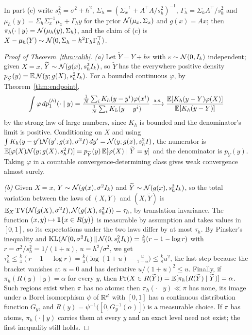 \documentclass{article}
\theoremstyle{plain}
\theoremstyle{remark}
\begin{document}
In part (c) write $s_h^2=\sigma^2+h^2$, $\Sigma_h=(\Sigma_x^{-1}+A^\top A/s_h^2)^{-1}$, $\Gamma_h=\Sigma_hA^\top/s_h^2$ and $\mu_h(y)=\Sigma_h\Sigma_x^{-1}\mu_x+\Gamma_hy$ for the prior $\mathcal{N}(\mu_x,\Sigma_x)$ and $g(x)=Ax$; then $\pi_h(\cdot\mid y)=\mathcal{N}(\mu_h(y),\Sigma_h)$, and the claim of (c) is $X-\mu_h(Y)\sim\mathcal{N}(0,\Sigma_h-h^2\Gamma_h\Gamma_h^\top)$.

\begin{proof}[Proof of Theorem~\ref{thm:calib}]
\emph{(a)} Let $\widetilde Y=Y+h\varepsilon$ with $\varepsilon\sim\mathcal{N}(0,I_k)$ independent;
given $X=x$, $\widetilde Y\sim\mathcal{N}(g(x),s_h^2I_k)$, so $\widetilde Y$ has the everywhere
positive density $p_{\widetilde Y}(y)=\mathbb{E}\,\mathcal{N}(y;g(X),s_h^2I_k)$. For a bounded continuous
$\varphi$, by Theorem~\ref{thm:endpoint},
\begin{equation*}
\int\varphi\,dp_1^{(h)}(\cdot\mid y)
=\frac{\frac1N\sum_iK_h(y-y^i)\varphi(x^i)}{\frac1N\sum_iK_h(y-y^i)}
\xrightarrow{\text{a.s.}}
\frac{\mathbb{E}[K_h(y-Y)\varphi(X)]}{\mathbb{E}[K_h(y-Y)]}
\end{equation*}
by the strong law of large numbers, since $K_h$ is bounded and the denominator's limit is
positive. Conditioning on $X$ and using $\int K_h(y-y')\mathcal{N}(y';g(x),\sigma^2I)\,dy'=
\mathcal{N}(y;g(x),s_h^2I)$, the numerator is $\mathbb{E}[\varphi(X)\mathcal{N}(y;g(X),s_h^2I)]
=p_{\widetilde Y}(y)\,\mathbb{E}[\varphi(X)\mid\widetilde Y=y]$ and the denominator is
$p_{\widetilde Y}(y)$. Taking $\varphi$ in a countable convergence-determining class gives
weak convergence almost surely.

\emph{(b)} Given $X=x$, $Y\sim\mathcal{N}(g(x),\sigma^2I_k)$ and $\widetilde Y\sim\mathcal{N}(g(x),s_h^2I_k)$,
so the total variation between the laws of $(X,Y)$ and $(X,\widetilde Y)$ is
$\mathbb{E}_X\,\mathrm{TV}(\mathcal{N}(g(X),\sigma^2I),\mathcal{N}(g(X),s_h^2I))=\tau_h$, by translation
invariance. The function $(x,y)\mapsto\mathbf{1}\{x\in R(y)\}$ is measurable by assumption and
takes values in $[0,1]$, so its expectations under the two laws differ by at most $\tau_h$. By Pinsker's inequality and
$\mathrm{KL}(\mathcal{N}(0,\sigma^2I_k)\,\|\,\mathcal{N}(0,s_h^2I_k))=\frac k2(r-1-\log r)$ with
$r=\sigma^2/s_h^2=1/(1+u)$, $u=h^2/\sigma^2$, we get $\tau_h^2\le\frac k4(r-1-\log r)
=\frac k4\big(\log(1+u)-\frac u{1+u}\big)\le\frac k8u^2$, the last step because the
bracket vanishes at $u=0$ and has derivative $u/(1+u)^2\le u$. Finally, if
$\pi_h(R(y)\mid y)=\alpha$ for every $y$, then
$\Pr(X\in R(\widetilde Y))=\mathbb{E}[\pi_h(R(\widetilde Y)\mid\widetilde Y)]=\alpha$. Such regions
exist when $\pi$ has no atoms: then $\pi_h(\cdot\mid y)\ll\pi$ has none, its image under a
Borel isomorphism $\psi$ of $\mathbb{R}^d$ with $[0,1]$ has a continuous distribution function
$G_y$, and $R(y)=\psi^{-1}\big([0,G_y^{-1}(\alpha)]\big)$ is a measurable choice. If $\pi$
has atoms, $\pi_h(\cdot\mid y)$ carries them at every $y$ and an exact level need not exist;
the first inequality still holds.


\end{proof}
\end{document}
